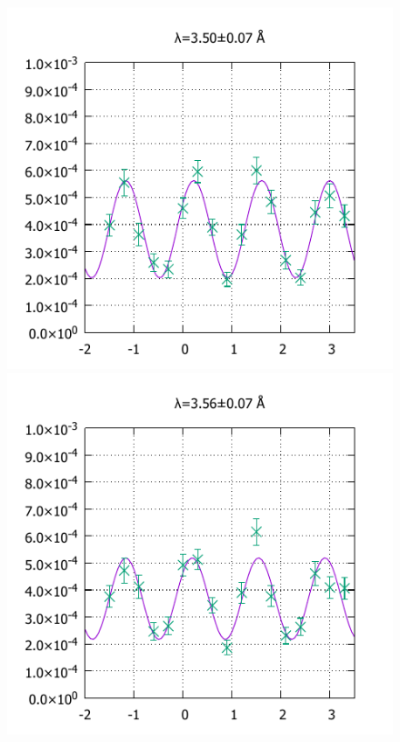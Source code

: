 \begin{figure}[H]
\begin{minipage}{0.33\hsize}
\end{minipage}
\begin{minipage}{0.33\hsize}
\includegraphics[width=\imgwidth]{phase_shifter/wl/wlf4.pdf}
\end{minipage}
\begin{minipage}{0.33\hsize}
\includegraphics[width=\imgwidth]{phase_shifter/wl/wlf5.pdf}
\end{minipage}

\end{figure}
